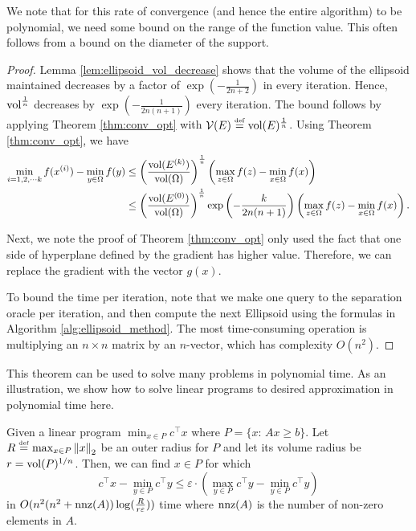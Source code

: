 \begin{rem}
We note that for this rate of convergence (and hence the entire algorithm)
to be polynomial, we need some bound on the range of the function
value. This often follows from a bound on the diameter of the support.
\end{rem}

\begin{proof}
Lemma \ref{lem:ellipsoid_vol_decrease} shows that the volume of the
ellipsoid maintained decreases by a factor of $\exp(-\frac{1}{2n+2})$
in every iteration. Hence, $\mathrm{vol}^{\frac{1}{n}}$ decreases by $\exp(-\frac{1}{2n(n+1)})$
every iteration. The bound follows by applying Theorem \ref{thm:conv_opt}
with $\mathcal{V}(E)\stackrel{\mathrm{{\scriptscriptstyle def}}}{=}\mathrm{vol}(E)^{\frac{1}{n}}$. Using Theorem \ref{thm:conv_opt},
we have 
\begin{align*}
\min_{i=1,2,\cdots k}f(x^{(i)})-\min_{y\in\Omega}f(y) & \le\left(\frac{\mathrm{vol}(E^{(k)})}{\mathrm{vol}(\Omega)}\right)^{\frac{1}{n}}\left(\max_{z\in\Omega}f(z)-\min_{x\in\Omega}f(x)\right)\\
 & \le\left(\frac{\mathrm{vol}(E^{(0)})}{\mathrm{vol}(\Omega)}\right)^{\frac{1}{n}}\exp\left(-\frac{k}{2n(n+1)}\right)\left(\max_{z\in\Omega}f(z)-\min_{x\in\Omega}f(x)\right).
\end{align*}

Next, we note the proof of Theorem \ref{thm:conv_opt} only used the
fact that one side of hyperplane defined by the gradient has higher
value. Therefore, we can replace the gradient with the vector $g(x)$. 

To bound the time per iteration, note that we make one query to the
separation oracle per iteration, and then compute the next Ellipsoid
using the formulas in Algorithm \ref{alg:ellipsoid_method}. The most
time-consuming operation is multiplying an $n\times n$ matrix by
an $n$-vector, which has complexity $O(n^{2})$.
\end{proof}
This theorem can be used to solve many problems in polynomial time.
As an illustration, we show how to solve linear programs to desired
approximation in polynomial time here. 
\begin{thm}
Given a linear program $\min_{x\in P}c^{\top}x$ where $P=\{x\text{: }Ax\geq b\}$.
Let $R\stackrel{\mathrm{{\scriptscriptstyle def}}}{=}\max_{x\in P}\left\Vert x\right\Vert_{2}$ be an outer radius for $P$
and let its volume radius be $r=\mathrm{vol}(P)^{1/n}$. Then, we can find
$x\in P$ for which 
\[
c^{\top}x-\min_{y\in P}c^{\top}y\leq\varepsilon\cdot(\max_{y\in P}c^{\top}y-\min_{y\in P}c^{\top}y)
\]
in $O(n^{2}(n^{2}+\mathrm{nnz}(A))\log(\frac{R}{r\varepsilon}))$ time where
$\mathrm{nnz}(A)$ is the number of non-zero elements in $A$.
\end{thm}

